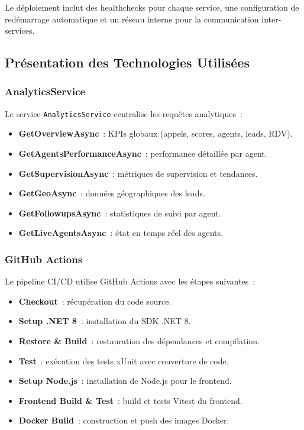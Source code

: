 Le déploiement inclut des healthchecks pour chaque service, une configuration de
redémarrage automatique et un réseau interne pour la communication inter-services.

\subsection{Présentation des Technologies Utilisées}
\label{subsec:sprint6_tech}

\subsubsection{AnalyticsService}

Le service \texttt{AnalyticsService} centralise les requêtes analytiques~:

\begin{itemize}
    \item \textbf{GetOverviewAsync}~: KPIs globaux (appels, scores, agents, leads, RDV).
    \item \textbf{GetAgentsPerformanceAsync}~: performance détaillée par agent.
    \item \textbf{GetSupervisionAsync}~: métriques de supervision et tendances.
    \item \textbf{GetGeoAsync}~: données géographiques des leads.
    \item \textbf{GetFollowupsAsync}~: statistiques de suivi par agent.
    \item \textbf{GetLiveAgentsAsync}~: état en temps réel des agents.
\end{itemize}

\subsubsection{GitHub Actions}

Le pipeline CI/CD utilise GitHub Actions avec les étapes suivantes~:

\begin{itemize}
    \item \textbf{Checkout}~: récupération du code source.
    \item \textbf{Setup .NET 8}~: installation du SDK .NET 8.
    \item \textbf{Restore \& Build}~: restauration des dépendances et compilation.
    \item \textbf{Test}~: exécution des tests xUnit avec couverture de code.
    \item \textbf{Setup Node.js}~: installation de Node.js pour le frontend.
    \item \textbf{Frontend Build \& Test}~: build et tests Vitest du frontend.
    \item \textbf{Docker Build}~: construction et push des images Docker.
\end{itemize}

